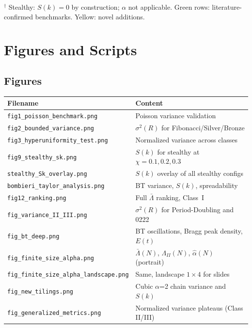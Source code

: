 \documentclass[11pt,letterpaper]{article}
\begin{document}
\vspace{0.4em}
\noindent$^\dagger$ Stealthy: $S(k) = 0$ by construction; $\alpha$ not applicable.
Green rows: literature-confirmed benchmarks. Yellow: novel additions.

\section{Figures and Scripts}

\subsection*{Figures}

\noindent\begin{tabular}{ll}
\toprule
\textbf{Filename} & \textbf{Content} \\
\midrule
\texttt{fig1\_poisson\_benchmark.png}   & Poisson variance validation \\
\texttt{fig2\_bounded\_variance.png}    & $\sigma^2(R)$ for Fibonacci/Silver/Bronze \\
\texttt{fig3\_hyperuniformity\_test.png}& Normalized variance across classes \\
\texttt{fig9\_stealthy\_sk.png}         & $S(k)$ for stealthy at $\chi=0.1,0.2,0.3$ \\
\texttt{stealthy\_Sk\_overlay.png}      & $S(k)$ overlay of all stealthy configs \\
\texttt{bombieri\_taylor\_analysis.png} & BT variance, $S(k)$, spreadability \\
\texttt{fig12\_ranking.png}             & Full $\bar\Lambda$ ranking, Class~I \\
\texttt{fig\_variance\_II\_III.png}     & $\sigma^2(R)$ for Period-Doubling and 0222 \\
\midrule
\texttt{fig\_bt\_deep.png}              & BT oscillations, Bragg peak density, $E(t)$ \\
\texttt{fig\_finite\_size\_alpha.png}   & $\bar\Lambda(N)$, $\Lambda_{II}(N)$, $\hat\alpha(N)$ (portrait) \\
\texttt{fig\_finite\_size\_alpha\_landscape.png} & Same, landscape $1\times4$ for slides \\
\texttt{fig\_new\_tilings.png}          & Cubic $\alpha$=2 chain variance and $S(k)$ \\
\texttt{fig\_generalized\_metrics.png}  & Normalized variance plateaus (Class II/III) \\

\end{tabular}
\end{document}
